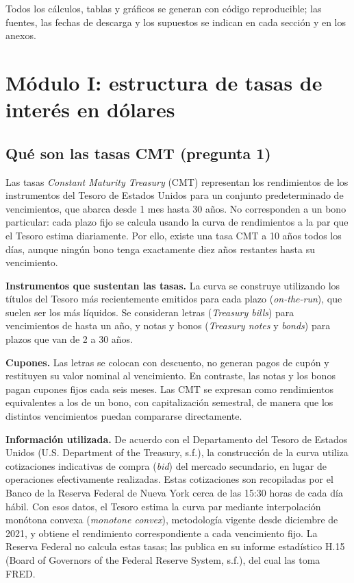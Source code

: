 \documentclass[11pt,letterpaper]{article}
\begin{document}
Todos los cálculos, tablas y gráficos se generan con código reproducible; las fuentes,
las fechas de descarga y los supuestos se indican en cada sección y en los anexos.

\section{Módulo I: estructura de tasas de interés en dólares}

\subsection{Qué son las tasas CMT (pregunta 1)}

Las tasas \emph{Constant Maturity Treasury} (CMT) representan los rendimientos de los instrumentos del Tesoro de Estados Unidos para un conjunto predeterminado de vencimientos, que abarca desde 1 mes hasta 30 años. No corresponden a un bono particular: cada plazo fijo se calcula usando la curva de rendimientos a la par que el Tesoro estima diariamente. Por ello, existe una tasa CMT a 10 años todos los días, aunque ningún bono tenga exactamente diez años restantes hasta su vencimiento.

\textbf{Instrumentos que sustentan las tasas.} La curva se construye utilizando los títulos del Tesoro más recientemente emitidos para cada plazo (\emph{on-the-run}), que suelen ser los más líquidos. Se consideran letras (\emph{Treasury bills}) para vencimientos de hasta un año, y notas y bonos (\emph{Treasury notes} y \emph{bonds}) para plazos que van de 2 a 30 años.

\textbf{Cupones.} Las letras se colocan con descuento, no generan pagos de cupón y restituyen su valor nominal al vencimiento. En contraste, las notas y los bonos pagan cupones fijos cada seis meses. Las CMT se expresan como rendimientos equivalentes a los de un bono, con capitalización semestral, de manera que los distintos vencimientos puedan compararse directamente.

\textbf{Información utilizada.} De acuerdo con el Departamento del Tesoro de Estados Unidos (U.S. Department of the Treasury, s.f.), la construcción de la curva utiliza cotizaciones indicativas de compra (\emph{bid}) del mercado secundario, en lugar de operaciones efectivamente realizadas. Estas cotizaciones son recopiladas por el Banco de la Reserva Federal de Nueva York cerca de las 15:30 horas de cada día hábil. Con esos datos, el Tesoro estima la curva par mediante interpolación monótona convexa (\emph{monotone convex}), metodología vigente desde diciembre de 2021, y obtiene el rendimiento correspondiente a cada vencimiento fijo. La Reserva Federal no calcula estas tasas; las publica en su informe estadístico H.15 (Board of Governors of the Federal Reserve System, s.f.), del cual las toma FRED.
\end{document}
